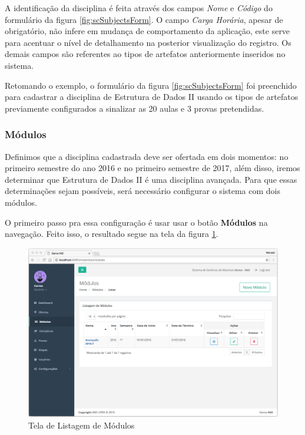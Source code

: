 A identificação da disciplina é feita através dos campos \textit{Nome} e \textit{Código} do formulário da figura \hyperref[fig:scSubjectsForm]{\ref{fig:scSubjectsForm}}. O campo \textit{Carga Horária}, apesar de obrigatório, não infere em mudança de comportamento da aplicação, este serve para acentuar o nível de detalhamento na posterior visualização do registro. Os demais campos são referentes ao tipos de artefatos anteriormente inseridos no sistema.

Retomando o exemplo, o formulário da figura \hyperref[fig:scSubjectsForm]{\ref{fig:scSubjectsForm}} foi preenchido para cadastrar a disciplina de Estrutura de Dados II usando os tipos de artefatos previamente configurados a sinalizar as 20 aulas e 3 provas pretendidas.

\subsubsection{Módulos}\label{modules}

Definimos que a disciplina cadastrada deve ser ofertada em dois momentos: no primeiro semestre do ano 2016 e no primeiro semestre de 2017, além disso, iremos determinar que Estrutura de Dados II é uma disciplina avançada. Para que essas determinações sejam possíveis, será necessário configurar o sistema com dois módulos.

O primeiro passo pra essa configuração é usar usar o botão \textbf{Módulos} na navegação. Feito isso, o resultado segue na tela da figura \hyperref[fig:scModulesList]{\ref{fig:scModulesList}}.

\begin{figure}[H]
\centering
     \includegraphics[width=1.0\textwidth]{Screens/ModulesList.png}
      \caption{Tela de Listagem de Módulos}
       \label{fig:scModulesList}
\end{figure}


